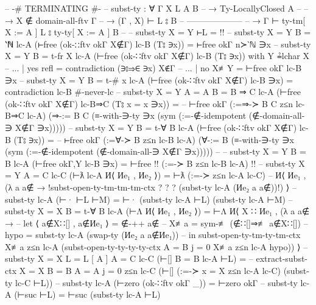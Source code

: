 \documentclass[logo,bsc,singlespacing,parskip,online]{infthesis}
\renewenvironment{code}{\mintedcopy[breaklines,breaksymbolleft=\;]{agda}}{\endmintedcopy}
\begin{document}
\begin{code}
--   {-# TERMINATING #-}
--   subst-ty : ∀ {Γ X L A B}
--     → Ty-LocallyClosed A
--     -- → X ∉ domain-all-ftv Γ
--     → (Γ , X) ⊢ L ⦂ B
--       --------------------
--     → Γ ⊢ ty-tm[ X := A ] L ⦂ ty-ty[ X := A ] B
-- --   subst-ty {X = Y} ⊢L = {!!}
--   subst-ty {X = Y} {B = ‵ℕ} lc-A (⊢free (ok-∷ftv okΓ X∉Γ) lc-B (T⦂ ∋x)) = ⊢free okΓ n≻‵ℕ ∋x
--   subst-ty {X = Y} {B = t-fr X} lc-A (⊢free (ok-∷ftv okΓ X∉Γ) lc-B (T⦂ ∋x)) with Y ≟lchar X
--   ... | yes refl = contradiction (∋⦂⇒∈ ∋x) X∉Γ
--   ... | no  X≢Y  = ⊢free okΓ lc-B ∋x
--   subst-ty {X = Y} {B = t-# x} lc-A (⊢free (ok-∷ftv okΓ X∉Γ) lc-B ∋x) = contradiction lc-B #-never-lc
--   subst-ty {X = Y} {A = A} {B = B ⇒ C} lc-A (⊢free (ok-∷ftv okΓ X∉Γ) lc-B⇒C (T⦂ {x = x} ∋x)) =
--     ⊢free okΓ (:=⇒-≻ B C z≤n lc-B⇒C lc-A) (⇒-:= B C (≡-with-∋-ty ∋x (sym (:=-∉-idempotent (∉-domain-all-∋ X∉Γ ∋x)))))
--   subst-ty {X = Y} {B = t-∀ B} lc-A (⊢free (ok-∷ftv okΓ X∉Γ) lc-B (T⦂ ∋x)) =
--     ⊢free okΓ (:=∀-≻ B z≤n lc-B lc-A) (∀-:= B (≡-with-∋-ty ∋x (sym (:=-∉-idempotent (∉-domain-all-∋ X∉Γ ∋x)))))
-- --   subst-ty {X = Y} {B = B} lc-A (⊢free okΓ,Y lc-B ∋x) = ⊢free {!!} (:=-≻ B z≤n lc-B lc-A) {!!}
--   subst-ty {X = Y} {A = C} lc-C (⊢ƛ lc-A И⟨ Иe₁ , Иe₂ ⟩) = ⊢ƛ (:=-≻ z≤n lc-A lc-C)
--     И⟨ Иe₁ , (λ a {a∉} → {!subst-open-ty-tm-tm-tm-ctx ? ? ? (subst-ty lc-A (Иe₂ a {a∉}))!}) ⟩
--   subst-ty lc-A (⊢· ⊢L ⊢M) = ⊢· (subst-ty lc-A ⊢L) (subst-ty lc-A ⊢M)
--   subst-ty {X = X} {B = t-∀ B} lc-A (⊢Λ И⟨ Иe₁ , Иe₂ ⟩) = ⊢Λ И⟨ X ∷ Иe₁ , (λ a {a∉} →
--     let ⟨ a∉X∷[] , a∉Иe₁ ⟩ = ∉-++ a∉
--         X≢a = sym-≢ (∉∷[]⇒≢ a∉X∷[])
--         hypo = subst-ty lc-A (swap-ty (Иe₂ a {a∉Иe₁}))
--     in subst-open-ty-tm-ty-tm-ctx X≢a z≤n lc-A (subst-open-ty-ty-ty-ty-ctx {A = B} {j = 0} X≢a z≤n lc-A hypo)) ⟩
--   subst-ty {X = X} {L = L [ A ]} {A = C} lc-C (⊢[] {B = B} lc-A ⊢L) =
--     extract-subst-ctx {X = X} {B = B} {A = A} {j = 0} z≤n lc-C (⊢[] (:=-≻ {x = X} z≤n lc-A lc-C) (subst-ty lc-C ⊢L))
--   subst-ty lc-A (⊢zero (ok-∷ftv okΓ _)) = ⊢zero okΓ
--   subst-ty lc-A (⊢suc ⊢L) = ⊢suc (subst-ty lc-A ⊢L)


\end{code}
\end{document}
